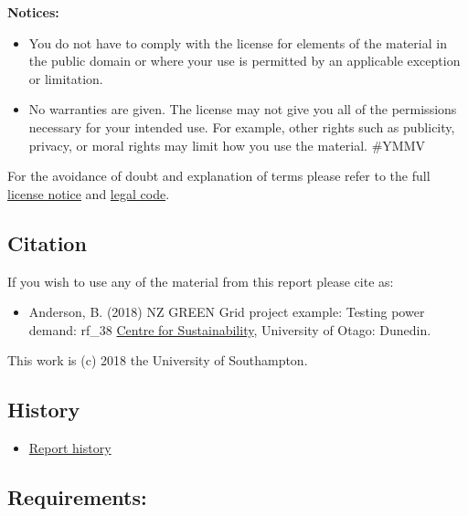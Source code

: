 \documentclass[]{article}
\providecommand{\tightlist}{%
  \setlength{\itemsep}{0pt}\setlength{\parskip}{0pt}}
\theoremstyle{definition}
\theoremstyle{definition}
\theoremstyle{definition}
\theoremstyle{remark}
\begin{document}
\textbf{Notices:}

\begin{itemize}
\tightlist
\item
  You do not have to comply with the license for elements of the
  material in the public domain or where your use is permitted by an
  applicable exception or limitation.
\item
  No warranties are given. The license may not give you all of the
  permissions necessary for your intended use. For example, other rights
  such as publicity, privacy, or moral rights may limit how you use the
  material. \#YMMV
\end{itemize}

For the avoidance of doubt and explanation of terms please refer to the
full \href{https://creativecommons.org/licenses/by-sa/4.0/}{license
notice} and
\href{https://creativecommons.org/licenses/by-sa/4.0/legalcode}{legal
code}.

\subsection{Citation}\label{citation}

If you wish to use any of the material from this report please cite as:

\begin{itemize}
\tightlist
\item
  Anderson, B. (2018) NZ GREEN Grid project example: Testing power
  demand: rf\_38
  \href{http://www.otago.ac.nz/centre-sustainability/}{Centre for
  Sustainability}, University of Otago: Dunedin.
\end{itemize}

This work is (c) 2018 the University of Southampton.

\subsection{History}\label{history}

\begin{itemize}
\tightlist
\item
  \href{https://github.com/CfSOtago/GREENGridData/commits/master/examples/testHouseholdPower.Rmd}{Report
  history}
\end{itemize}

\subsection{Requirements:}\label{requirements}
\end{document}
